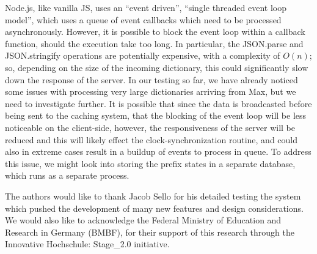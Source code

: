Node.js, like vanilla JS, uses an ``event driven'', ``single threaded event loop model'', which uses a queue of event callbacks which need to be processed asynchronously.
However, it is possible to block the event loop\cite{node-eventloop} within a callback function, should the execution take too long.
In particular, the JSON.parse and JSON.stringify operations are potentially expensive, with a complexity of $O(n)$; so, depending on the size of the incoming dictionary, this could significantly slow down the response of the server.
In our testing so far, we have already noticed some issues with processing very large dictionaries arriving from Max, but we need to investigate further.
It is possible that since the data is broadcasted before being sent to the caching system, that the blocking of the event loop will be less noticeable on the client-side, however, the responsiveness of the server will be reduced and this will likely effect the clock-synchronization routine, and could also in extreme cases result in a buildup of events to process in queue.
To address this issue, we might look into storing the prefix states in a separate database, which runs as a separate process.


\begin{acknowledgments}
The authors would like to thank Jacob Sello for his detailed testing the system which pushed the development of many new features and design considerations. We would also like to acknowledge the Federal Ministry of Education and Research in Germany (BMBF), for their support of this research through the Innovative Hochschule: Stage\_2.0 initiative.
\end{acknowledgments} 

\balance







